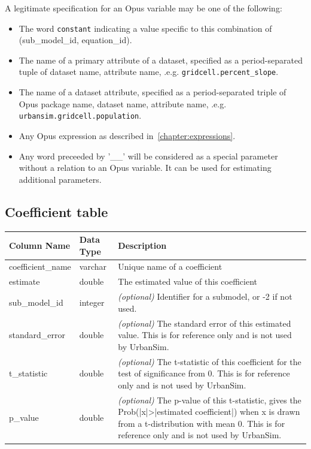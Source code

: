 A legitimate specification for an Opus variable may be one of the following:

\begin{itemize}

\item The word \verb|constant| indicating a value specific to this combination
of (sub_model_id, equation_id).

\item The name of a primary attribute of a dataset, specified as a period-separated
tuple of dataset name, attribute name, .e.g.
\verb|gridcell.percent_slope|.

\item The name of a dataset attribute, specified as a period-separated triple of
Opus package name, dataset name, attribute name, .e.g. \verb|urbansim.gridcell.population|.

\item Any Opus expression as described in~\ref{chapter:expressions}.
 
\item Any word preceeded by '__' will be considered as a special parameter without a relation to an Opus variable.
It can be used for estimating additional parameters.
\end{itemize}

\subsection{Coefficient table}

\begin{tabular}{llp{4.5in}}

\textbf{Column Name} & \textbf{Data Type} & \textbf{Description} \\

\hline
coefficient_name & varchar & Unique name of a coefficient  \\

\hline
estimate & double & The estimated value of this coefficient \\

\hline
sub_model_id & integer &  \emph{(optional)} Identifier for a submodel, or
-2 if not used. \\

\hline
standard_error & double & \emph{(optional) }
The standard error of this estimated value. This is for reference only and is
not used by UrbanSim.  \\

\hline
t_statistic & double & \emph{(optional) }
The t-statistic of this coefficient for the test of significance from 0. This
is for reference only and is not used by UrbanSim.  \\

\hline p_value & double & \emph{(optional) } The p-value of this t-statistic,
gives the Prob(|x|\textgreater{}|estimated coefficient|) when x is drawn from a
t-distribution with mean 0. This is for reference only and is not used by
UrbanSim.   \\

\hline

\end{tabular}

